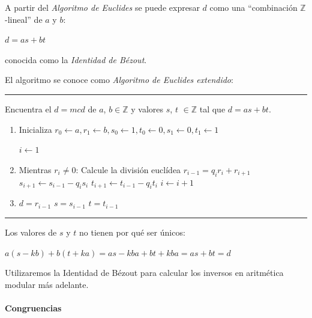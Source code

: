 A partir del \textit{Algoritmo de Euclides} se puede expresar $d$ como una ``combinación $\mathbb{Z}$-lineal'' de $a$ y $b$:
\begin{center}
	$d = as + bt$
\end{center}
conocida como la \textit{Identidad de Bézout}.

\hfil

El algoritmo se conoce como \textit{Algoritmo de Euclides extendido}:

\rule{\textwidth}{1pt}
\begin{algorithm}
	Encuentra el $d = mcd$ de $a$, $b \in \mathbb{Z}$ y valores $s$, $t$ $\in \mathbb{Z}$ tal que $d = as + bt$.
	\begin{enumerate}
		\item Inicializa ${\displaystyle r_{0}\gets a,r_{1}\gets b,s_{0}\gets 1,t_{0}\gets 0,s_{1}\gets 0,t_{1}\gets 1}$
		
		$i\gets 1$
		
		\item Mientras $r_i \neq 0$:
		\subitem Calcule la división euclídea $r_{i-1} = q_i r_i + r_{i+1}$
		\subitem ${\displaystyle s_{i+1}\gets s_{i-1}-q_{i}s_{i}}$
		\subitem ${\displaystyle t_{i+1}\gets t_{i-1}-q_{i}t_{i}}$
		\subitem $i \gets i+1$
		
		\item $d = r_{i-1}$	\quad	$s = s_{i-1}$ \quad  $t = t_{i-1}$
	\end{enumerate}
\end{algorithm}
\rule{\textwidth}{1pt}


\begin{remark}
	Los valores de $s$ y $t$ no tienen por qué ser únicos:
	
	${\displaystyle a(s-kb)+b(t+ka)=as-kba+bt+kba=as+bt = d}$
\end{remark}

\hfil

Utilizaremos la Identidad de Bézout para calcular los inversos en aritmética modular más adelante.

\hfil












\paragraph{Congruencias}


